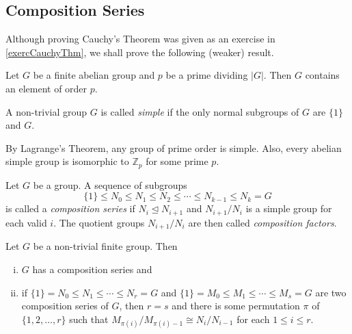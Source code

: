 \subsection{Composition Series}

Although proving Cauchy's Theorem was given as an exercise in \ref{exercCauchyThm}, we shall prove the following (weaker) result.

\begin{lemma}
    Let $G$ be a finite abelian group and $p$ be a prime dividing $|G|$. Then $G$ contains an element of order $p$.
\end{lemma}

\begin{definition}
    A non-trivial group $G$ is called \textit{simple} if the only normal subgroups of $G$ are $\{1\}$ and $G$.
\end{definition}

By Lagrange's Theorem, any group of prime order is simple. Also, every abelian simple group is isomorphic to $\mathbb{Z}_p$ for some prime $p$.

\begin{definition}
    Let $G$ be a group. A sequence of subgroups
    $$\{1\}\leq N_0\leq N_1\leq N_2\leq\cdots\leq N_{k-1}\leq N_k=G$$
    is called a \textit{composition series} if $N_i\unlhd N_{i+1}$ and $N_{i+1}/N_i$ is a simple group for each valid $i$. The quotient groups $N_{i+1}/N_i$ are then called \textit{composition factors}.
\end{definition}

\begin{theorem}
    Let $G$ be a non-trivial finite group. Then
    \begin{enumerate}[(i)]
        \item $G$ has a composition series and
        \item if $\{1\}=N_0\leq N_1\leq\cdots\leq N_r=G$ and $\{1\}=M_0\leq M_1\leq\cdots\leq M_s=G$ are two composition series of $G$, then $r=s$ and there is some permutation $\pi$ of $\{1,2,\ldots,r\}$ such that
        $M_{\pi(i)}/M_{\pi(i)-1}\cong N_i/N_{i-1}$ for each $1\leq i\leq r$.
    \end{enumerate}
\end{theorem}



\clearpage